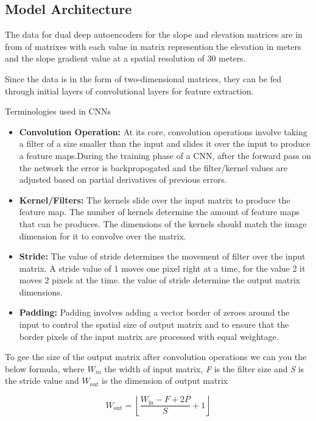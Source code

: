 \documentclass[a4paper,12pt]{Classes/RoboticsLaTeX}
\begin{document}
	\subsection{Model Architecture}

	The data for dual deep autoencoders for the slope and elevation matrices are in from of matrixes with each
	value in matrix represention the elevation in meters and the slope gradient value at a spatial resolution of 
	30 meters. 

	Since the data is in the form of two-dimensional matrices, they can be fed through initial layers of convolutional 
	layers for feature extraction. 
	
	Terminologies used in \ac{CNNs}
	\begin{itemize}
		\item \textbf{Convolution Operation: }At its core, convolution operations involve taking a filter of a size smaller than the 
		input and slides it over the input to produce a feature maps.During the training phase of a \ac{CNN}, after the forward pass on the network the error is backpropogated
		and the filter/kernel values are adjusted based on partial derivatives of previous errors. 
		\item \textbf{Kernel/Filters: }The kernels slide over the input matrix to produce the feature map. The number of kernels determine the amount of feature maps
		that can be produces. The dimensions of the kernels should match the image dimension for it to convolve over the matrix.
		\item \textbf{Stride: } The value of stride determines the movement of filter over the input matrix. A stride value of 1
		moves one pixel right at a time, for the value 2 it moves 2 pixels at the time. the value of stride determine the output matrix dimensions.
		\item \textbf{Padding: }Padding involves adding a vector border of zeroes around the input to control the spatial size of 
		output matrix and to ensure that the border pixels of the input matrix are processed with equal weightage.
	 \end{itemize}

	 To gee the size of the output matrix after convolution operations we can you the below formula, where
	 $\textit{W}_{in}$ the width of input matrix, \textit{F} is the filter size and \textit{S} is the stride value and
	 $\textit{W}_{out}$ is the dimension of output matrix

	 \[W_{\text{out}} = \left\lfloor \frac{W_{\text{in}} - F + 2P}{S} + 1 \right\rfloor\]
\end{document}
